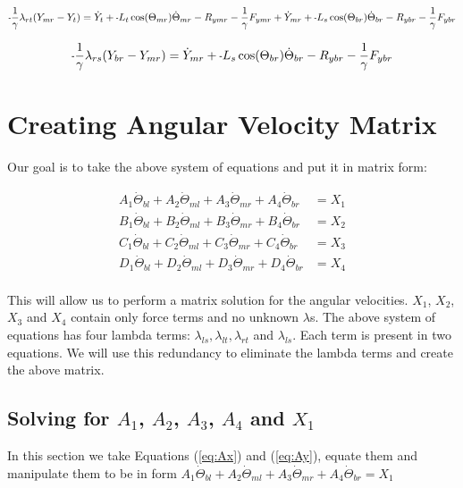 \documentclass[11pt, landscape]{article}
\newcommand{\mn}{\scalebox{0.7}[1.0]{-}}
\begin{document}
\begin{equation}
\mn\frac{1}{\gamma}\lambda_{rt}(Y_{mr} - Y_{t }) =
\dot{Y}_{t } + \mn L_{t}\cos(\Theta_{mr})\dot{\Theta}_{mr} - R_{ymr} - \frac{1}{\gamma}F_{ymr} + \dot{Y}_{mr} + \mn L_{s}\cos(\Theta_{br})\dot{\Theta}_{br}
- R_{ybr} - \frac{1}{\gamma}F_{ybr}
\label{eq:Cy}
\end{equation}%

\begin{equation}
\mn\frac{1}{\gamma}\lambda_{rs}(Y_{br} - Y_{mr}) = \dot{Y}_{mr} + \mn L_{s}\cos(\Theta_{br})\dot{\Theta}_{br} - R_{ybr} - \frac{1}{\gamma}F_{ybr}
\label{eq:Dy}
\end{equation}%

\section{Creating Angular Velocity Matrix}

Our goal is to take the above system of equations and put it in matrix form: 


\begin{align}
  A_1\dot{\Theta}_{bl} + A_2 \dot{\Theta}_{ml} + A_3 \dot{\Theta}_{mr} + A_4 \dot{\Theta}_{br} &= X_1 \\
  B_1\dot{\Theta}_{bl} + B_2 \dot{\Theta}_{ml} + B_3 \dot{\Theta}_{mr} + B_4 \dot{\Theta}_{br} &= X_2 \\
  C_1\dot{\Theta}_{bl} + C_2 \dot{\Theta}_{ml} + C_3 \dot{\Theta}_{mr} + C_4 \dot{\Theta}_{br} &= X_3 \\
  D_1\dot{\Theta}_{bl} + D_2 \dot{\Theta}_{ml} + D_3 \dot{\Theta}_{mr} + D_4 \dot{\Theta}_{br} &= X_4 \\
\end{align}

This will allow us to perform a matrix solution for the angular velocities. $X_1$, $X_2$, $X_3$ and $X_4$ contain only force terms and no unknown $\lambda$s. The above system of equations has four lambda terms: $\lambda_{ls}, \lambda_{lt}, \lambda_{rt}$ and $\lambda_{ls}$. Each term is present in two equations. We will use this redundancy to eliminate the lambda terms and create the above matrix.

\subsection{Solving for $A_1$, $A_2$, $A_3$, $A_4$ and $X_1$}
In this section we take Equations (\ref{eq:Ax}) and (\ref{eq:Ay}), equate them and manipulate them to be in form $A_1\dot{\Theta}_{bl} + A_2 \dot{\Theta}_{ml} + A_3 \dot{\Theta}_{mr} + A_4 \dot{\Theta}_{br} = X_1$\\
\end{document}
